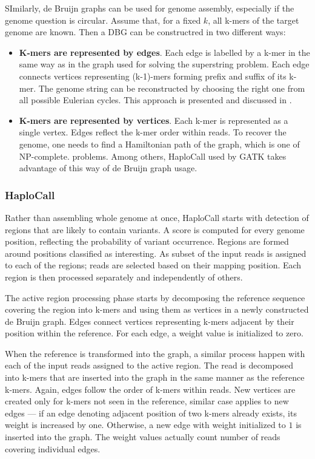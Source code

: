 SImilarly, de Bruijn graphs can be used for genome assembly, especially if the genome question is circular. Assume that, for a fixed $k$, all k-mers of the target genome are known. Then a DBG can be constructred in two different ways:
\begin{itemize}
\item \textbf{K-mers are represented by edges}. Each edge is labelled by a k-mer in the same way as in the graph used for solving the superstring problem. Each edge connects vertices representing (k-1)-mers forming prefix and suffix of its k-mer. The genome string can be reconstructed by choosing the right one from all possible Eulerian cycles. This approach is presented and discussed in \cite{dbg-apply}.
\item \textbf{K-mers are represented by vertices}. Each k-mer is represented as a single vertex. Edges reflect the k-mer order within reads. To recover the genome, one needs to find a Hamiltonian path of the graph, which is one of NP-complete. problems. Among others, HaploCall \cite{haplocall} used by GATK takes advantage of this way of de Bruijn graph usage.
\end{itemize}

\subsubsection{HaploCall}
\label{subsub:haplocall}

Rather than assembling whole genome at once, HaploCall starts with detection of regions that are likely to contain variants. A score is computed for every genome position, reflecting the probability of variant occurrence. Regions are formed around positions classified as interesting. As subset of the input reads is assigned to each of the regions; reads are selected based on their mapping position. Each region is then processed separately and independently of others.

The active region processing phase starts by decomposing the reference sequence covering the region into k-mers and using them as vertices in a newly constructed de Bruijn graph. Edges connect vertices representing k-mers adjacent by their position within the reference. For each edge, a weight value is initialized to zero.

When the reference is transformed into the graph, a similar process happen with each of the input reads assigned to the active region. The read is decomposed into k-mers that are inserted into the graph in the same manner as the reference k-mers. Again, edges follow the order of k-mers within reads.  New vertices are created only for k-mers not seen in the reference, similar case applies to new edges --- if an edge denoting adjacent position of two k-mers already exists, its weight is increased by one. Otherwise, a new edge with weight initialized to $1$ is inserted into the graph. The weight values actually count number of reads covering individual edges.

